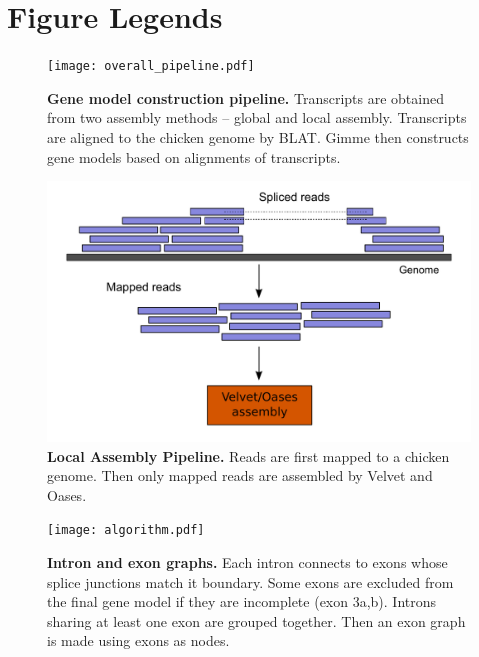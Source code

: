 \documentclass[10pt]{article}
\begin{document}
\section*{Figure Legends}
\begin{figure}[!ht]
\begin{center}
\texttt{[image: overall\_pipeline.pdf]}
\end{center}
\caption{
{\bf Gene model construction pipeline.} Transcripts are obtained from two
assembly methods -- global and local assembly.  Transcripts are aligned to the
chicken genome by BLAT\@. Gimme then constructs gene models based on alignments
of transcripts.  }
\label{overall_pipeline}
\end{figure}

\begin{figure}[!ht]
\begin{center}
\includegraphics[width=5in]{local_assembly}
\end{center}
\caption{
{\bf Local Assembly Pipeline.}
Reads are first mapped to a chicken genome.  Then only mapped reads are
assembled by Velvet and Oases.
}
\label{local_assembly}
\end{figure}

\begin{figure}[!ht]
\begin{center}
\texttt{[image: algorithm.pdf]}
\end{center}
\caption{
{\bf Intron and exon graphs.} Each intron connects to exons whose splice
junctions match it boundary.  Some exons are excluded from the final gene model
if they are incomplete (exon 3a,b).  Introns sharing at least one exon are
grouped together.  Then an exon graph is made using exons as nodes.
}
\label{algorithm}
\end{figure}
\end{document}
